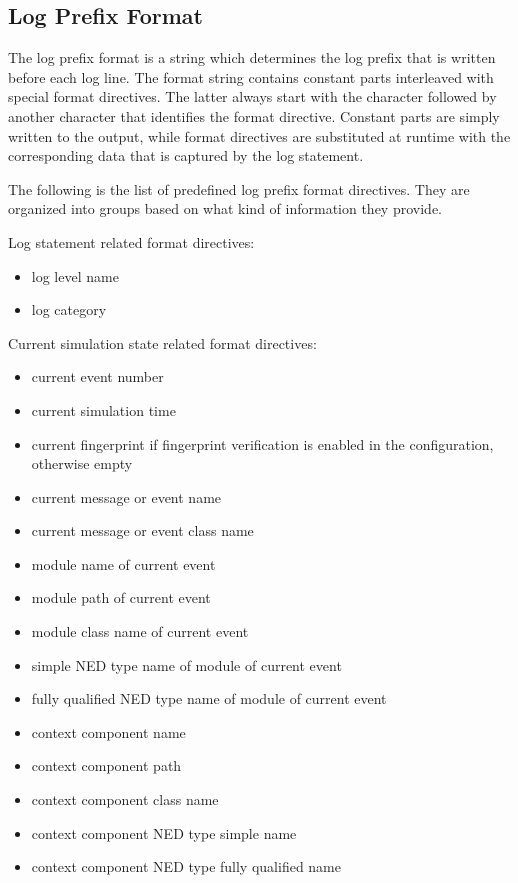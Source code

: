 \subsection{Log Prefix Format}
\label{sec:config-sim:log-prefix-format}

The log prefix format is a string which determines the log prefix that is written
before each log line. The format string contains constant parts interleaved with
special format directives. The latter always start with the \ttt{\%} character
followed by another character that identifies the format directive. Constant
parts are simply written to the output, while format directives are substituted
at runtime with the corresponding data that is captured by the log statement.

The following is the list of predefined log prefix format directives. They are
organized into groups based on what kind of information they provide.

Log statement related format directives:
\begin{itemize}
  \item {} log level name
  \item {} log category
\end{itemize}

Current simulation state related format directives:
\begin{itemize}
  \item {} current event number
  \item {} current simulation time
  \item {} current fingerprint if fingerprint verification is enabled in the configuration, otherwise empty
  \item {} current message or event name
  \item {} current message or event class name
  \item {} module name of current event
  \item {} module path of current event
  \item {} module class name of current event
  \item {} simple NED type name of module of current event
  \item {} fully qualified NED type name of module of current event
  \item {} context component name
  \item {} context component path
  \item {} context component class name
  \item {} context component NED type simple name
  \item {} context component NED type fully qualified name
\end{itemize}

